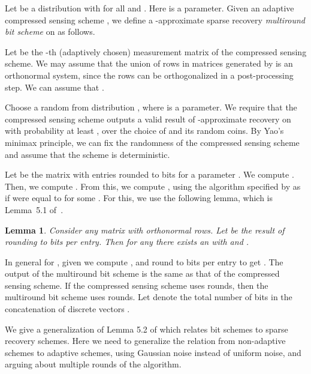 \documentclass[twoside,leqno,twocolumn]{article}
\newtheorem{lemma}[theorem]{Lemma}
\begin{document}
  Let  be a distribution with  for all  and .  Here  is a parameter. 
Given an adaptive compressed 
  sensing scheme , we define a
  -approximate  sparse recovery
  {\it multiround bit scheme} on  as follows. 

Let  be the -th (adaptively chosen) measurement matrix of the compressed sensing scheme. 
We may assume that the union of rows in matrices  generated by 
is an orthonormal system, since the rows can be orthogonalized in a post-processing step. 
We can assume that . 

  Choose a random  
from distribution ,
  where  is a parameter.  
  We require that the compressed sensing scheme outputs a valid result of 
  -approximate recovery on  with probability at least , 
  over the choice of  and its random coins. By Yao's minimax principle, we can fix the 
  randomness of the compressed sensing scheme and
  assume that the scheme is deterministic. 

Let  be the matrix
   with entries rounded to  bits for a parameter . 
  We compute . Then, we compute 
  . From this, we compute , 
   using the algorithm specified by  as if  were equal to 
    for some . For this, we use the following lemma, which is Lemma~5.1 of~\cite{DIPW}.
\begin{lemma}\label{lem:roundingFix}
Consider any  matrix  with orthonormal rows. Let  be the result
of rounding  to  bits per entry. Then for any  there
exists an  with  and .
\end{lemma}

  In general for , given  we 
  compute , and round to 
  bits per entry to get .
  The output of the multiround bit scheme is the same as that of 
  the compressed sensing scheme. If the compressed sensing scheme uses  rounds, then the multiround
  bit scheme uses  rounds. Let  denote the total number of bits in the concatenation of discrete
  vectors . 

We give a generalization of Lemma 5.2 of \cite{PW11} which relates bit
schemes to sparse recovery schemes. Here we need to generalize the relation
from non-adaptive schemes to adaptive schemes, using Gaussian noise instead of uniform noise,
and arguing about multiple rounds of the algorithm. 
\end{document}
